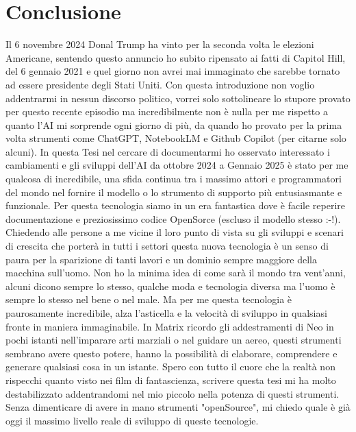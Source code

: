 \documentclass[12pt,a4paper,openright,twoside]{book}
\begin{document}
\chapter{Conclusione}
Il 6 novembre 2024 Donal Trump ha vinto per la seconda volta le elezioni Americane, sentendo questo annuncio ho subito ripensato ai fatti di Capitol Hill, del 6 gennaio 2021 e quel giorno non avrei mai immaginato che sarebbe tornato ad essere presidente degli Stati Uniti. Con questa introduzione non voglio addentrarmi in nessun discorso politico, vorrei solo sottolineare lo stupore provato per questo recente episodio ma incredibilmente  non è nulla per me rispetto a quanto l'AI mi sorprende ogni giorno di più, da quando ho provato per la prima volta strumenti come ChatGPT, NotebookLM e Github Copilot (per citarne solo alcuni).
In questa Tesi nel cercare di documentarmi ho osservato interessato i cambiamenti e gli sviluppi dell'AI da ottobre 2024 a Gennaio 2025 è stato per me qualcosa di incredibile, una sfida continua tra i massimo attori e programmatori del mondo nel fornire il modello o lo strumento di supporto più entusiasmante e funzionale.
Per questa tecnologia siamo in un era fantastica dove è facile reperire documentazione e preziosissimo codice OpenSorce (escluso il modello stesso :-!).
Chiedendo alle persone a me vicine il loro punto di vista su gli sviluppi e scenari di crescita che porterà in tutti i settori questa nuova tecnologia è un senso di paura per la sparizione di tanti lavori e un dominio sempre maggiore della macchina sull'uomo. 
Non ho la minima idea di come sarà il mondo tra vent'anni, alcuni dicono sempre lo stesso, qualche moda e tecnologia diversa ma l'uomo è sempre lo stesso nel bene o nel male.
Ma per me questa tecnologia è paurosamente incredibile, alza l'asticella e la velocità di sviluppo in qualsiasi fronte in maniera immaginabile. In Matrix ricordo gli addestramenti di Neo in pochi istanti nell'imparare arti marziali o nel guidare un aereo, questi strumenti sembrano avere questo potere, hanno la possibilità di elaborare, comprendere e generare qualsiasi cosa in un istante.
Spero con tutto il cuore che la realtà non rispecchi quanto visto nei film di fantascienza,
scrivere questa tesi mi ha molto destabilizzato addentrandomi nel mio piccolo nella potenza di questi strumenti.
Senza dimenticare di avere in mano strumenti "openSource", mi chiedo quale è già oggi il massimo livello reale di sviluppo di queste tecnologie.








\backmatter

\nocite{*} %



\end{document}
